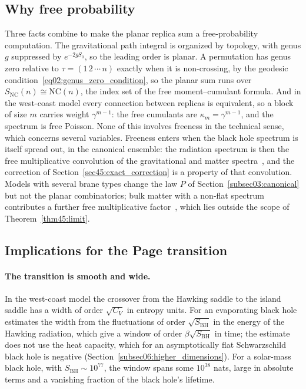 \documentclass[11pt,letterpaper]{article}
\theoremstyle{plain}
\theoremstyle{definition}
\theoremstyle{remark}
\begin{document}
\subsection{Why free probability}
\label{subsec06:why_free}

Three facts combine to make the planar replica sum a free-probability computation. The gravitational path integral is organized by topology, with genus $g$ suppressed by $e^{-2gS_0}$, so the leading order is planar. A permutation has genus zero relative to $\tau = (1\,2\,\cdots\,n)$ exactly when it is non-crossing, by the geodesic condition~\eqref{eq02:genus_zero_condition}, so the planar sum runs over $S_{\mathrm{NC}}(n) \cong \mathrm{NC}(n)$, the index set of the free moment--cumulant formula. And in the west-coast model every connection between replicas is equivalent, so a block of size $m$ carries weight $\gamma^{m-1}$: the free cumulants are $\kappa_m = \gamma^{m-1}$, and the spectrum is free Poisson. None of this involves freeness in the technical sense, which concerns several variables. Freeness enters when the black hole spectrum is itself spread out, in the canonical ensemble: the radiation spectrum is then the free multiplicative convolution of the gravitational and matter spectra~\citep{wang2023}, and the correction of Section~\ref{sec45:exact_correction} is a property of that convolution. Models with several brane types change the law $P$ of Section~\ref{subsec03:canonical} but not the planar combinatorics; bulk matter with a non-flat spectrum contributes a further free multiplicative factor~\citep{wang2023}, which lies outside the scope of Theorem~\ref{thm45:limit}.

\subsection{Implications for the Page transition}
\label{subsec06:information_paradox}

\paragraph{The transition is smooth and wide.} In the west-coast model the crossover from the Hawking saddle to the island saddle has a width of order $\sqrt{C_V}$ in entropy units. For an evaporating black hole \citet{penington2020} estimates the width from the fluctuations of order $\sqrt{S_{\mathrm{BH}}}$ in the energy of the Hawking radiation, which give a window of order $\beta\sqrt{S_{\mathrm{BH}}}$ in time; the estimate does not use the heat capacity, which for an asymptotically flat Schwarzschild black hole is negative (Section~\ref{subsec06:higher_dimensions}). For a solar-mass black hole, with $S_{\mathrm{BH}} \sim 10^{77}$, the window spans some $10^{38}$ nats, large in absolute terms and a vanishing fraction of the black hole's lifetime.
\end{document}
